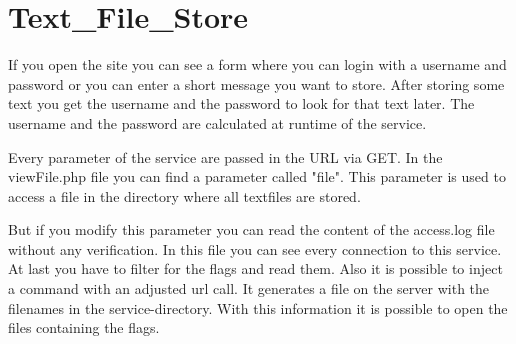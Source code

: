 \chapter{Text\_File\_Store}
If you open the site you can see a form where you can login with a username and password or you can enter a short message you want to store.
After storing some text you get the username and the password to look for that text later. The username and the password are calculated at runtime of the service. 

Every parameter of the service are passed in the URL via GET. In the viewFile.php file you can find a parameter called "file". This parameter is used to access a file in the directory where all textfiles are stored. 

But if you modify this parameter you can read the content of the access.log file without any verification. 
In this file you can see every connection to this service. At last you have to filter for the flags and read them. 
Also it is possible to inject a command with an adjusted url call. It generates a file on the server with the filenames in the service-directory. With this information it is possible to open the files containing the flags. 
